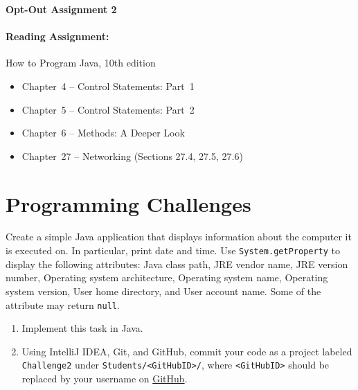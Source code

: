 \documentclass[11pt]{article}
\begin{document}
\begin{center}
{\bfseries \LARGE Opt-Out Assignment 2}
\end{center}

\paragraph{Reading Assignment:}
How to Program Java, 10th edition
\begin{itemize}
\item Chapter~4 -- Control Statements: Part~1
\item Chapter~5 -- Control Statements: Part~2
\item Chapter~6 -- Methods: A Deeper Look
\item Chapter~27 -- Networking (Sections 27.4, 27.5, 27.6)
\end{itemize}


\section*{Programming Challenges}

Create a simple Java application that displays information about the computer it is executed on.
In particular, print date and time.
Use \texttt{System.getProperty} to display the following attributes: Java class path, JRE vendor name, JRE version number, Operating system architecture, Operating system name, Operating system version, User home directory, and User account name.
Some of the attribute may return \texttt{null}.

\begin{enumerate}
\item Implement this task in Java.
\item Using IntelliJ IDEA, Git, and GitHub, commit your code as a project labeled \texttt{Challenge2} under \texttt{Students/<GitHubID>/}, where \texttt{<GitHubID>} should be replaced by your username on \href{https://GitHub.com}{GitHub}.
\end{enumerate}
\end{document}
